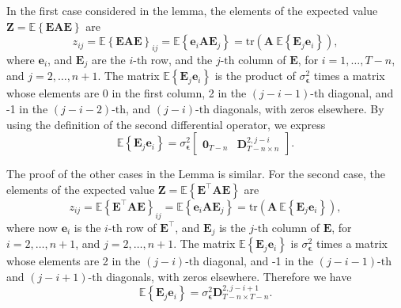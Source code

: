 \begin{pf}
In the first case considered in the lemma, the elements of the expected value $\mathbf{Z} = \mathbb{E} \left\{ \mathbf{E} \mathbf{A} \mathbf{E} \right\}$ are
\begin{equation} z_{ij} = \mathbb{E} \left\{ \mathbf{E} \mathbf{A} \mathbf{E} \right\}_{ij} = \mathbb{E} \left\{ \mathbf{e}_i \mathbf{A} \mathbf{E}_j \right\} = \mathrm{tr} \left( \mathbf{A} \ \mathbb{E} \left\{ \mathbf{E}_j \mathbf{e}_i \right\} \right) , \end{equation}
where $\mathbf{e}_i$, and $\mathbf{E}_j$ are the $i\text{-th}$ row, and the $j\text{-th}$ column of $\mathbf{E}$, for $i = 1, \ldots, T-n$, and $j = 2, \ldots, n+1$.
The matrix $\mathbb{E} \left\{ \mathbf{E}_j \mathbf{e}_i \right\}$ is the product of $\sigma_{\bm{\epsilon}}^2$ times a matrix whose elements are 0 in the first column, 2 in the $(j-i-1) \text{-th}$ diagonal, and -1 in the $(j-i-2) \text{-th}$, and $(j-i) \text{-th}$ diagonals, with zeros elsewhere.
By using the definition of the second differential operator, we express
\begin{equation} \mathbb{E} \left\{ \mathbf{E}_j \mathbf{e}_i \right\} = \sigma_{\bm{\epsilon}}^2 \begin{bmatrix} \mathbf{0}_{T-n} & \mathbf{D}_{T-n \times n}^{2, j-i} \end{bmatrix}. \end{equation}

The proof of the other cases in the Lemma is similar. 
For the second case, the elements of the expected value $\mathbf{Z} = \mathbb{E} \left\{ \mathbf{E}^\top \mathbf{A} \mathbf{E} \right\}$ are
\begin{equation} z_{ij} = \mathbb{E} \left\{ \mathbf{E}^\top \mathbf{A} \mathbf{E} \right\}_{ij} = \mathbb{E} \left\{ \mathbf{e}_i \mathbf{A} \mathbf{E}_j \right\} = \mathrm{tr} \left( \mathbf{A} \ \mathbb{E} \left\{ \mathbf{E}_j \mathbf{e}_i \right\} \right) , \end{equation}
where now $\mathbf{e}_i$ is the $i\text{-th}$ row of $\mathbf{E}^\top$, and $\mathbf{E}_j$ is the $j\text{-th}$ column of $\mathbf{E}$, for $i = 2, \ldots, n+1$, and $j = 2, \ldots, n+1$.
The matrix $\mathbb{E} \left\{ \mathbf{E}_j \mathbf{e}_i \right\}$ is $\sigma_{\bm{\epsilon}}^2$ times a matrix whose elements are 2 in the $(j-i) \text{-th}$ diagonal, and -1 in the $(j-i-1) \text{-th}$ and $(j-i+1) \text{-th}$ diagonals, with zeros elsewhere.
Therefore we have
\begin{equation} \mathbb{E} \left\{ \mathbf{E}_j \mathbf{e}_i \right\} = \sigma_{\bm{\epsilon}}^2 \mathbf{D}_{T-n \times T-n}^{2,j-i+1}. \end{equation}


\end{pf}
